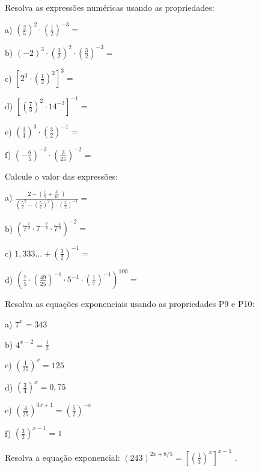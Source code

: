 \begin{exercicios}
\exitem{} Resolva as expressões numéricas usando as propriedades:

\begin{multicols}{3}
    a)  \(  \left( \frac{2}{5} \right) ^{2} \cdot  \left( \frac{1}{2} \right) ^{-3}= \)
    
    b)  \(  \left( -2 \right) ^{3} \cdot  \left( \frac{3}{2} \right) ^{2} \cdot  \left( \frac{3}{2} \right) ^{-3}=  \)
    
    c)  \(  \left[ 2^{3} \cdot  \left( \frac{1}{2} \right) ^{2} \right] ^{3}= \)

    d)  \(  \left[  \left( \frac{7}{3} \right) ^{2} \cdot 14^{-3} \right] ^{-1}= \)

    e)  \(  \left( \frac{3}{4} \right) ^{3} \cdot  \left( \frac{3}{2} \right) ^{-1}= \) 
    
    f)  \(  \left( -\frac{6}{5} \right) ^{-3} \cdot  \left( \frac{3}{25} \right) ^{-2}= \) 
\end{multicols}

\exitem{} Calcule o valor das expressões:

\begin{multicols}{2}
    a) \( \frac{2- \left( \frac{1}{5}+\frac{3}{10}~  \right)  }{ \left( \frac{5}{2}^{2}- \left( \frac{5}{2} \right) ^{2} \right)  \cdot  \left( \frac{5}{2} \right) ^{-1}}= \)

    b) \(  \left( 7^{\frac{1}{3}} \cdot 7^{-\frac{2}{3}} \cdot  7^{\frac{4}{3}} \right) ^{-2}= \)

    c)  \( 1,333 \ldots + \left( \frac{3}{2} \right) ^{-1}= \) 
    
    d)  \(  \left( \frac{7}{5} \cdot  \left( \frac{49}{25} \right) ^{-1} \cdot 5^{-1}  \cdot  \left( \frac{1}{7} \right) ^{-1} \right) ^{100}= \) 
\end{multicols}

\exitem{} Resolva as equações exponenciais usando as propriedades P9 e P10:

\begin{multicols}{3}
a)  \( 7^{x}=343 \)

b)   \( 4^{x-2}=\frac{1}{2} \)

c)  \(  \left( \frac{1}{25} \right) ^{x}=125 \)

d)  \(  \left( \frac{3}{4} \right) ^{x}=0,75 \)

e)  \(  \left( \frac{4}{25} \right) ^{3x+1}= \left( \frac{5}{2} \right) ^{-x} \) 

f)  \(  \left( \frac{3}{2} \right) ^{x-1}=1 \) 
\end{multicols}

\exitem{} Resolva a equação exponencial:  \(  \left( 243 \right) ^{2x+8/5}= \left[  \left( \frac{1}{3} \right) ^{x} \right] ^{x-1} \) .
\end{exercicios}

